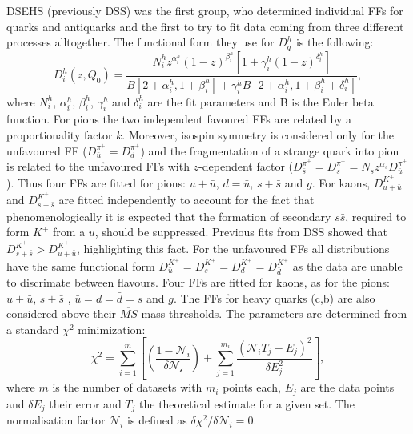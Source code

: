 DSEHS (previously DSS) was the first group, who determined individual FFs for quarks and antiquarks and the first to try to fit data coming from three different processes alltogether.
The functional form they use for $D^h_q$ is the following:
%
\begin{equation}
  D^h_i (z,Q_0) = \frac{N^h_i z^{\alpha^h_i}(1-z)^{\beta^h_i}\left[ 1+\gamma^h_i(1-z)^{\delta^h_i}\right]}{B\left[2+\alpha^h_i,1+\beta^h_i\right]+\gamma^h_i B\left[2+\alpha^h_i,1+\beta^h_i+\delta^h_i\right]},
  \label{eq:DSEHSparam}
\end{equation}
%
where $N^h_i$, $\alpha^h_i$, $\beta^h_i$, $\gamma^h_i$ and $\delta^h_i$  are the fit parameters and B is the Euler beta function. For pions the two independent favoured FFs are related by a proportionality factor $k$. Moreover, isospin symmetry is considered only for the unfavoured FF ($D^{\pi^{+}}_{\bar{u}} = D^{\pi^{+}}_{d}$) and the fragmentation of a strange quark into pion is related to the unfavoured FFs with $z$-dependent factor ($D^{\pi^{+}}_{\bar{s}} = D^{\pi^{+}}_{s}=N_s z^{\alpha_s} D^{\pi^{+}}_{\bar{u}}$). Thus four FFs are fitted for pions: $u+\bar{u}$, $d=\bar{u}$, $s+\bar{s}$ and $g$. For kaons, $D^{K^+}_{u+\bar{u}}$ and $D^{K^+}_{s+\bar{s}}$ are fitted independently to account for the fact that phenomenologically it is expected that the formation of secondary $s\bar{s}$, required to form $K^+$ from a $u$, should be suppressed. Previous fits from DSS showed that $D^{K^+}_{s+\bar{s}} > D^{K^+}_{u+\bar{u}}$, highlighting this fact. For the unfavoured FFs all distributions have the same functional form  $D^{K^+}_{\bar{u}} = D^{K^+}_{s} = D^{K^+}_{d} = D^{K^+}_{\bar{d}}$ as the data are unable to discrimate between flavours. Four FFs are fitted for kaons, as for the pions:  $u+\bar{u}$, $s+\bar{s}$ , $\bar{u}=d=\bar{d}=s$ and $g$.
The FFs for heavy quarks (c,b) are also considered above their $\overline{MS}$ mass thresholds.
The parameters are determined from a standard $\chi^2$ minimization:
%
\begin{equation}
  \chi^2 =  \sum_{i=1}^{m} \left[ \left( \frac{1-\mathscr{N}_i}{\delta\mathscr{N_i}} \right) + \sum_{j=1}^{m_i} \frac{(\mathscr{N}_i T_j - E_j)^2}{\delta E^2_j} \right],
  \label{eq:DSEHSmin}
\end{equation}
%
where $m$ is the number of datasets with $m_i$ points each, $E_j$ are the data points and $\delta E_j$ their error and $T_j$ the theoretical estimate for a given set. The normalisation factor $\mathscr{N}_i$ is defined as $\delta \chi^2 / \delta\mathscr{N}_i = 0$.

